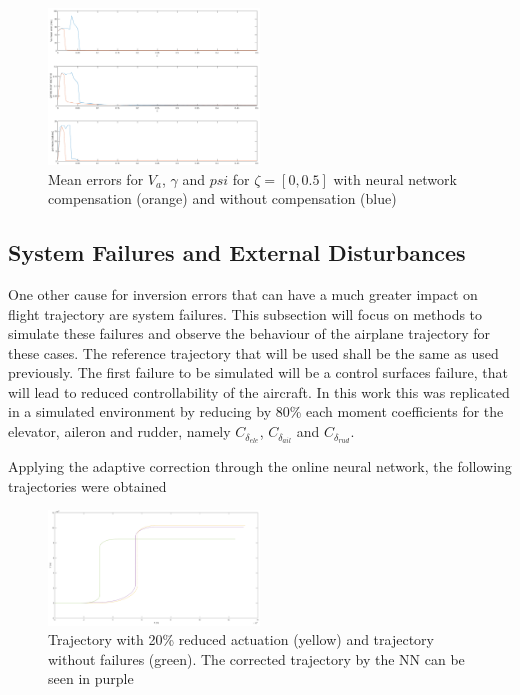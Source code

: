 \begin{figure}[h]
\centering
\includegraphics[width=0.5\textwidth]{../Figures/Results/mean_error_xi.png}
\caption[Mean errors for $V_a$, $\gamma$ and $psi$]{Mean errors for $V_a$, $\gamma$ and $psi$ for $\zeta=[0,0.5]$ with neural network compensation (orange) and without compensation (blue)}
\label{fig:xi_mean_error}
\end{figure}

\subsection{System Failures and External Disturbances}

One other cause for inversion errors that can have a much greater impact on flight trajectory are system failures. This subsection will focus on methods to simulate these failures and observe the behaviour of the airplane trajectory for these cases. The reference trajectory that will be used shall be the same as used previously. The first failure to be simulated will be a control surfaces failure, that will lead to reduced controllability of the aircraft. In this work this was replicated in a simulated environment by reducing by 80\% each moment coefficients for the elevator, aileron and rudder, namely $C_{\delta_{ele}}$, $C_{\delta_{ail}}$ and $C_{\delta_{rud}}$.

Applying the adaptive correction through the online neural network, the following trajectories were obtained

\begin{figure}[h]
\centering
\includegraphics[width=0.5\textwidth]{../Figures/Results/reduced_act_NN.png}
\caption[Trajectory with reduced actuation corrected with NN correction]{Trajectory with 20\% reduced actuation (yellow) and trajectory without failures (green). The corrected trajectory by the NN can be seen in purple}
\label{fig:reduced_act_NN}
\end{figure}

